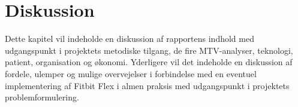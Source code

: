\chapter{Diskussion}
Dette kapitel vil indeholde en diskussion af rapportens indhold med udgangspunkt i projektets metodiske tilgang, de fire MTV-analyser, teknologi, patient, organisation og økonomi. Yderligere vil det indeholde en diskussion af fordele, ulemper og mulige overvejelser i forbindelse med en eventuel implementering af Fitbit Flex i almen praksis med udgangspunkt i projektets problemformulering.







